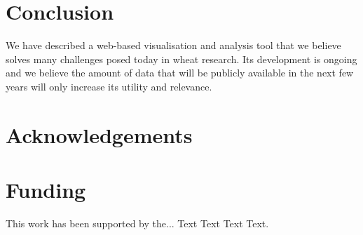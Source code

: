\documentclass{bioinfo}
\begin{document}
%
%






\section{Conclusion}

We have described a web-based visualisation and analysis tool that we believe solves many challenges posed today in wheat research. 
Its development is ongoing and we believe the amount of data that will be publicly available in the next few years will only increase its utility and relevance.

\section*{Acknowledgements}


\section*{Funding}

This work has been supported by the... Text Text  Text Text.\vspace*{-12pt}




\end{document}
